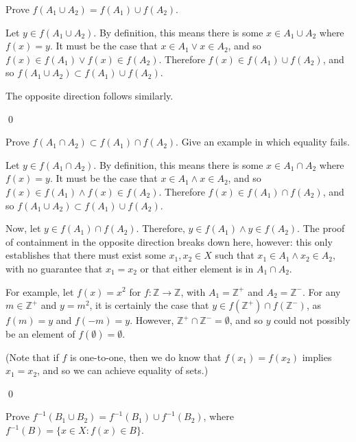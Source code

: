 \begin{exlist}
    \item Prove $f(A_1 \cup A_2) = f(A_1) \cup f(A_2)$.
    \hrlist

    Let $y \in f(A_1 \cup A_2)$. By definition, this means there is some $x \in A_1 \cup A_2$ where $f(x) = y$. It must be the case that $x \in A_1 \lor x \in A_2$, and so $f(x) \in f(A_1) \lor f(x) \in f(A_2)$. Therefore $f(x) \in f(A_1) \cup f(A_2)$, and so $f(A_1 \cup A_2) \subset f(A_1) \cup f(A_2)$.

    \medskip

    The opposite direction follows similarly.

    \qed
    \pagebreak
    \item Prove $f(A_1 \cap A_2) \subset f(A_1) \cap f(A_2)$. Give an example in which equality fails.
    \hrlist

    Let $y \in f(A_1 \cap A_2)$. By definition, this means there is some $x \in A_1 \cap A_2$ where $f(x) = y$. It must be the case that $x \in A_1 \land x \in A_2$, and so $f(x) \in f(A_1) \land f(x) \in f(A_2)$. Therefore $f(x) \in f(A_1) \cap f(A_2)$, and so $f(A_1 \cup A_2) \subset f(A_1) \cup f(A_2)$.

    \medskip

    Now, let $y \in f(A_1) \cap f(A_2)$. Therefore, $y \in f(A_1) \land y \in f(A_2)$. The proof of containment in the opposite direction breaks down here, however: this only establishes that there must exist some $x_1, x_2 \in X$ such that $x_1 \in A_1 \land x_2 \in A_2$, with no guarantee that $x_1 = x_2$ or that either element is in $A_1 \cap A_2$.

    \medskip

    For example, let $f(x) = x^2$ for $f: \mathbb{Z} \rightarrow \mathbb{Z}$, with $A_1 = \mathbb{Z}^+$ and $A_2 = \mathbb{Z}^-$. For any $m \in \mathbb{Z}^+$ and $y = m^2$, it is certainly the case that $y \in f(\mathbb{Z}^+) \cap f(\mathbb{Z}^-)$, as $f(m) = y$ and $f(-m) = y$. However, $\mathbb{Z}^+ \cap \mathbb{Z}^- = \emptyset$, and so $y$ could not possibly be an element of $f(\emptyset) = \emptyset$.

    \medskip

    (Note that if $f$ is one-to-one, then we do know that $f(x_1) = f(x_2)$ implies $x_1 = x_2$, and so we can achieve equality of sets.)
    
    \qed
    \item\label{funcunion} Prove $f^{-1}(B_1 \cup B_2) = f^{-1}(B_1) \cup f^{-1}(B_2)$, where $f^{-1}(B) = \{x \in X : f(x) \in B\}$.
    \hrlist


\end{exlist}
